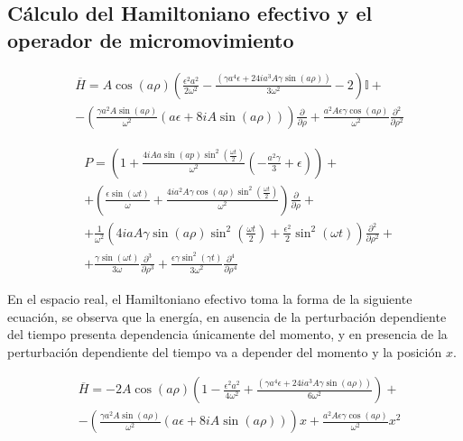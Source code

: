 \subsection{Cálculo del Hamiltoniano efectivo y el operador de micromovimiento}

\begin{equation}\label{eq:10.36}
\begin{split}
     &\overline{H}=A\cos (a \rho)\left(\frac{ \epsilon^2a^2 }{2 \omega^2}-\frac{\left(\gamma a^4
   \epsilon+24 i a^3 A\gamma \sin (a \rho)\right)}{3 \omega^2}-2 \right)\mathbb{I}+\\&
   -\left(\frac{\gamma a^2A \sin (a \rho)}{\omega^2}\left(a \epsilon+8 i A \sin (a \rho)\right)\right)\frac{\partial}{\partial \rho}+\frac{a^2 A \epsilon \gamma \cos (a \rho)}{\omega^2}\frac{\partial^2}{\partial \rho^2}
   \end{split}
\end{equation}

\begin{equation}\label{eq:10.37}
    \begin{split}
        &P=\left(1+\frac{4 iAa\sin (a p) \sin ^2\left(\frac{\omega t}{2}\right)}{\omega ^2}\left(-\frac{ a^2 \gamma }{3}+  \epsilon\right)\right)+
   \\&+\left(\frac{\epsilon \sin (\omega t)}{\omega}+\frac{4 i a^2 A \gamma \cos (a \rho) \sin ^2\left(\frac{\omega t }{2}\right)}{\omega^2}\right)\frac{\partial}{\partial \rho}+\\&+
   \frac{1}{\omega^2}\left(4 i a A \gamma \sin (a \rho)\sin ^2\left(\frac{\omega t }{2}\right) +\frac{\epsilon^2}{2} \sin^2 (\omega t )\right)\frac{\partial^2}{\partial \rho^2}+
   \\&+\frac{\gamma \sin (\omega t)}{3 \omega}\frac{\partial^3}{\partial \rho^3}+\frac{\epsilon \gamma \sin ^2(\gamma t)}{3 \omega^2}\frac{\partial^4}{\partial \rho^4}
    \end{split}
\end{equation}

En el espacio real, el Hamiltoniano efectivo toma la forma de la siguiente ecuación, se observa que la energía, en ausencia de la perturbación dependiente del tiempo presenta dependencia únicamente del momento, y en presencia de la perturbación dependiente del tiempo va a depender del momento y la posición $x$.

\begin{equation}\label{eq:10.36.6}
\begin{split}
     &\overline{H}=-2A\cos (a \rho)\left(1-\frac{ \epsilon^2a^2 }{4 \omega^2}+\frac{\left(\gamma a^4
   \epsilon+24 i a^3 A\gamma \sin (a \rho)\right)}{6 \omega^2} \right)+\\&
   -\left(\frac{\gamma a^2A \sin (a \rho)}{\omega^2}\left(a \epsilon+8 i A \sin (a \rho)\right)\right)x+\frac{a^2 A \epsilon \gamma \cos (a \rho)}{\omega^2}x^2
   \end{split}
\end{equation}

